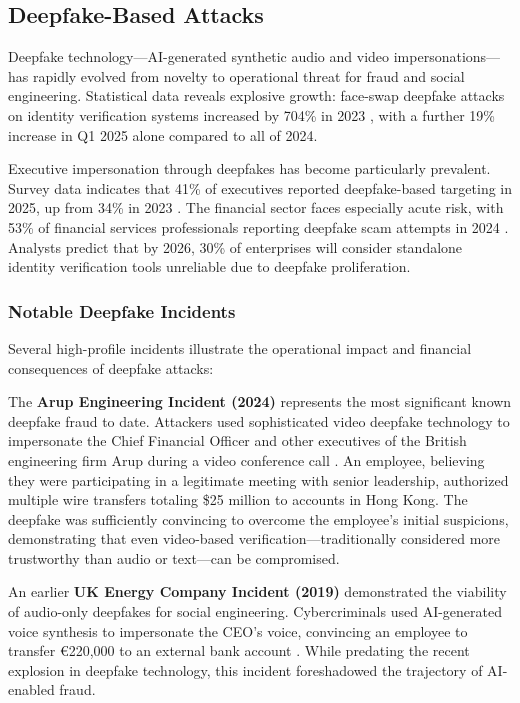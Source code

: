 \subsection{Deepfake-Based Attacks}

Deepfake technology---AI-generated synthetic audio and video impersonations---has rapidly evolved from novelty to operational threat for fraud and social engineering. Statistical data reveals explosive growth: face-swap deepfake attacks on identity verification systems increased by 704\% in 2023 \cite{zerothreat2025}, with a further 19\% increase in Q1 2025 alone compared to all of 2024.

Executive impersonation through deepfakes has become particularly prevalent. Survey data indicates that 41\% of executives reported deepfake-based targeting in 2025, up from 34\% in 2023 \cite{blackcloak2025}. The financial sector faces especially acute risk, with 53\% of financial services professionals reporting deepfake scam attempts in 2024 \cite{zerothreat2025}. Analysts predict that by 2026, 30\% of enterprises will consider standalone identity verification tools unreliable due to deepfake proliferation.

\subsubsection{Notable Deepfake Incidents}

Several high-profile incidents illustrate the operational impact and financial consequences of deepfake attacks:

The \textbf{Arup Engineering Incident (2024)} represents the most significant known deepfake fraud to date. Attackers used sophisticated video deepfake technology to impersonate the Chief Financial Officer and other executives of the British engineering firm Arup during a video conference call \cite{zerothreat2025}. An employee, believing they were participating in a legitimate meeting with senior leadership, authorized multiple wire transfers totaling \$25 million to accounts in Hong Kong. The deepfake was sufficiently convincing to overcome the employee's initial suspicions, demonstrating that even video-based verification---traditionally considered more trustworthy than audio or text---can be compromised.

An earlier \textbf{UK Energy Company Incident (2019)} demonstrated the viability of audio-only deepfakes for social engineering. Cybercriminals used AI-generated voice synthesis to impersonate the CEO's voice, convincing an employee to transfer \euro220,000 to an external bank account \cite{zerothreat2025}. While predating the recent explosion in deepfake technology, this incident foreshadowed the trajectory of AI-enabled fraud.

